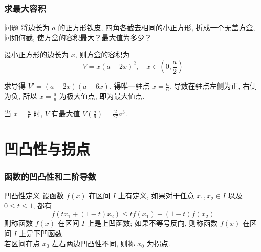 \documentclass[
10pt,
aspectratio=43,
]{beamer}
\begin{document}
\begin{frame}
	\frametitle{求最大容积}
	\everymath{\displaystyle}
	\begin{block}{问题}
		将边长为 $a$ 的正方形铁皮, 四角各截去相同的小正方形, 折成一个无盖方盒, 问如何截, 使方盒的容积最大？最大值为多少？
	\end{block}
	\pause
	\begin{block}{}
		设小正方形的边长为 $x$, 则方盒的容积为
		\[ V = x(a-2x)^2, \quad x \in \left(0, \frac{a}{2}\right) \]
	\end{block}
	\pause
	\begin{block}{}
		求导得 $V' = (a-2x)(a-6x)$, 得唯一驻点 $x = \frac{a}{6}$. 导数在驻点左侧为正, 右侧为负, 所以 $x = \frac{a}{6}$ 为极大值点, 即为最大值点.
	\end{block}
	\pause
	\begin{block}{}
		当 $x = \frac{a}{6}$ 时, $V$ 有最大值 $V\left(\frac{a}{6}\right) = \frac{2}{27}a^3$.
	\end{block}
\end{frame}

\section{凹凸性与拐点}
\begin{frame}
	\frametitle{函数的凹凸性和二阶导数}

	\begin{block}{凹凸性定义}
		设函数 $f(x)$ 在区间 $I$ 上有定义, 如果对于任意 $x_1, x_2 \in I$ 以及 $0 \leq t \leq 1$, 都有
		\[ f(tx_1 + (1-t)x_2) \leq tf(x_1) + (1-t)f(x_2) \]
		则称函数 $f(x)$ 在区间 $I$ 上是上凹函数; 如果不等号反向, 则称函数 $f(x)$ 在区间 $I$ 上是下凹函数.\\
		若区间在点 $x_0$ 左右两边凹凸性不同, 则称 $x_0$ 为拐点.
	\end{block}
\end{frame}
\end{document}
